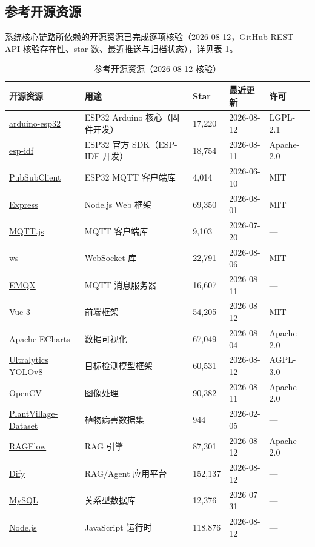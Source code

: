 \documentclass[11pt]{ctexart}
\begin{document}
\subsection{参考开源资源}
系统核心链路所依赖的开源资源已完成逐项核验（2026-08-12，GitHub REST API 核验存在性、star 数、最近推送与归档状态），详见表 \ref{tab:techoss}。
\begin{longtable}{p{3.0cm}p{5.0cm}p{1.6cm}p{1.9cm}p{1.5cm}}
  \caption{参考开源资源（2026-08-12 核验）}\label{tab:techoss}\\
  \toprule
  开源资源 & 用途 & Star & 最近更新 & 许可 \\
  \midrule
  \href{https://github.com/espressif/arduino-esp32}{arduino-esp32} & ESP32 Arduino 核心（固件开发） & 17,220 & 2026-08-12 & LGPL-2.1 \\
  \href{https://github.com/espressif/esp-idf}{esp-idf} & ESP32 官方 SDK（ESP-IDF 开发） & 18,754 & 2026-08-11 & Apache-2.0 \\
  \href{https://github.com/knolleary/PubSubClient}{PubSubClient} & ESP32 MQTT 客户端库 & 4,014 & 2026-06-10 & MIT \\
  \href{https://github.com/expressjs/express}{Express} & Node.js Web 框架 & 69,350 & 2026-08-01 & MIT \\
  \href{https://github.com/mqttjs/MQTT.js}{MQTT.js} & MQTT 客户端库 & 9,103 & 2026-07-20 & — \\
  \href{https://github.com/websockets/ws}{ws} & WebSocket 库 & 22,791 & 2026-08-06 & MIT \\
  \href{https://github.com/emqx/emqx}{EMQX} & MQTT 消息服务器 & 16,607 & 2026-08-11 & — \\
  \href{https://github.com/vuejs/core}{Vue 3} & 前端框架 & 54,205 & 2026-08-12 & MIT \\
  \href{https://github.com/apache/echarts}{Apache ECharts} & 数据可视化 & 67,049 & 2026-08-04 & Apache-2.0 \\
  \href{https://github.com/ultralytics/ultralytics}{Ultralytics YOLOv8} & 目标检测模型框架 & 60,531 & 2026-08-12 & AGPL-3.0 \\
  \href{https://github.com/opencv/opencv}{OpenCV} & 图像处理 & 90,382 & 2026-08-11 & Apache-2.0 \\
  \href{https://github.com/spMohanty/PlantVillage-Dataset}{PlantVillage-Dataset} & 植物病害数据集 & 944 & 2026-02-05 & — \\
  \href{https://github.com/infiniflow/ragflow}{RAGFlow} & RAG 引擎 & 87,301 & 2026-08-12 & Apache-2.0 \\
  \href{https://github.com/langgenius/dify}{Dify} & RAG/Agent 应用平台 & 152,137 & 2026-08-12 & — \\
  \href{https://github.com/mysql/mysql-server}{MySQL} & 关系型数据库 & 12,376 & 2026-07-31 & — \\
  \href{https://github.com/nodejs/node}{Node.js} & JavaScript 运行时 & 118,876 & 2026-08-12 & — \\
  \bottomrule
\end{longtable}
\end{document}
